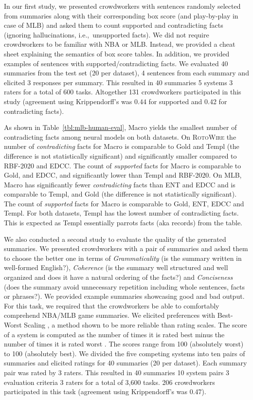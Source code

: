 \documentclass[11pt,a4paper]{article}
\begin{document}
In our first study, we presented crowdworkers with sentences randomly
selected from summaries along with their corresponding box score (and
play-by-play in case of MLB) and asked them to count supported and
contradicting facts (ignoring hallucinations, i.e.,~unsupported
facts).  We did not require crowdworkers to be familiar with NBA or
MLB.  Instead, we provided a cheat sheet explaining the semantics of
box score tables.  In addition, we provided examples of  sentences with
supported/contradicting facts. 
We evaluated 40 summaries from the test set (20 per dataset), 4
sentences from each summary and elicited 3 responses per summary.
This resulted in 40 summaries  5 systems  3 raters for
a total of 600 tasks.  Altogether 131 crowdworkers participated in
this study (agreement using Krippendorff's  was 0.44 for
supported and 0.42 for contradicting facts).

As shown in Table~\ref{tbl:mlb-human-eval}, Macro yields the smallest
number of contradicting facts among neural models on both datasets. On
\textsc{RotoWire} the number of \emph{contradicting} facts for Macro
is comparable to Gold and Templ (the difference is not statistically
significant) and significantly smaller compared to RBF-2020 and
EDCC.  The count of \emph{supported} facts for Macro is comparable
to Gold, and EDCC, and significantly lower than Templ and
RBF-2020. On MLB, Macro has significantly fewer \emph{contradicting}
facts than ENT and EDCC and is comparable to Templ, and Gold (the
difference is not statistically significant). The count of
\emph{supported} facts for Macro is comparable to Gold, ENT,
EDCC and Templ.  For both datasets, Templ
has the lowest number of contradicting facts. This is expected as
Templ essentially parrots facts (aka records) from the table.

We also conducted a second study to evaluate the quality of the
generated summaries. We presented crowdworkers with a pair of
summaries and asked them to choose the better one in terms of
\textsl{Grammaticality} (is the summary written in well-formed
English?), \textsl{Coherence} (is the summary well structured and well
organized and does it have a natural ordering of the facts?) and
\textsl{Conciseness} (does the summary avoid unnecessary repetition
including whole sentences, facts or phrases?).  We provided example
summaries showcasing good and bad output.  For this task, we required
that the crowdworkers be able to comfortably comprehend NBA/MLB game
summaries. We elicited preferences with Best-Worst Scaling
\cite{louviere1991best, louviere2015best}, a method shown to be more
reliable than rating scales. The score of a system is computed as the
number of times it is rated best minus the number of times it is rated
worst \cite{orme2009maxdiff}. The scores range from 100 (absolutely
worst) to 100 (absolutely best).  We divided the five competing
systems into ten pairs of summaries and elicited ratings for 40
summaries (20 per dataset). Each summary pair was rated by 3
raters. This resulted in 40 summaries  10 system pairs
 3 evaluation criteria  3 raters for a total of 3,600
tasks.  206 crowdworkers participated in this task (agreement using
Krippendorff's  was 0.47).
\end{document}
